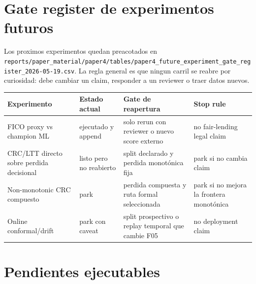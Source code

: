 \documentclass[
  spanish,
  11pt,
  letterpaper,
]{scrbook}
\newcounter{none} %
\theoremstyle{plain}
\theoremstyle{remark}
\begin{document}
\section{Gate register de experimentos
futuros}\label{gate-register-de-experimentos-futuros}

Los proximos experimentos quedan preacotados en
\texttt{reports/paper\_material/paper4/tables/paper4\_future\_experiment\_gate\_register\_2026-05-19.csv}.
La regla general es que ningun carril se reabre por curiosidad: debe
cambiar un claim, responder a un reviewer o traer datos nuevos.

{\def\LTcaptype{none} %
\begin{longtable}[]{@{}
  >{\raggedright\arraybackslash}p{}
  >{\raggedright\arraybackslash}p{}
  >{\raggedright\arraybackslash}p{}
  >{\raggedright\arraybackslash}p{}@{}}
\toprule\noalign{}
\begin{minipage}[b]{\linewidth}\raggedright
Experimento
\end{minipage} & \begin{minipage}[b]{\linewidth}\raggedright
Estado actual
\end{minipage} & \begin{minipage}[b]{\linewidth}\raggedright
Gate de reapertura
\end{minipage} & \begin{minipage}[b]{\linewidth}\raggedright
Stop rule
\end{minipage} \\
\midrule\noalign{}
\endhead
\bottomrule\noalign{}
\endlastfoot
FICO proxy vs champion ML & ejecutado y append & solo rerun con reviewer
o nuevo score externo & no fair-lending legal claim \\
CRC/LTT directo sobre perdida decisional & listo pero no reabierto &
split declarado y perdida monotónica fija & park si no cambia claim \\
Non-monotonic CRC compuesto & park & perdida compuesta y ruta formal
seleccionada & park si no mejora la frontera monotónica \\
Online conformal/drift & park con caveat & split prospectivo o replay
temporal que cambie F05 & no deployment claim \\
\end{longtable}
}

\section{Pendientes ejecutables}\label{pendientes-ejecutables}
\end{document}
